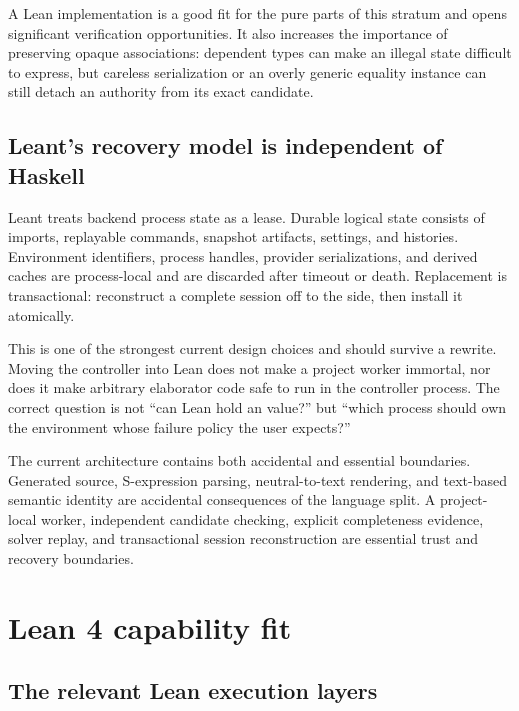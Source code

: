 \documentclass[10pt,letterpaper,oneside]{report}
\newcommand{\code}[1]{\texttt{\detokenize{#1}}}
\begin{document}
A Lean implementation is a good fit for the pure parts of this stratum and opens significant verification opportunities. It also increases the importance of preserving opaque associations: dependent types can make an illegal state difficult to express, but careless serialization or an overly generic equality instance can still detach an authority from its exact candidate.

\section{Leant's recovery model is independent of Haskell}

Leant treats backend process state as a lease. Durable logical state consists of imports, replayable commands, snapshot artifacts, settings, and histories. Environment identifiers, process handles, provider serializations, and derived caches are process-local and are discarded after timeout or death. Replacement is transactional: reconstruct a complete session off to the side, then install it atomically.

This is one of the strongest current design choices and should survive a rewrite. Moving the controller into Lean does not make a project worker immortal, nor does it make arbitrary elaborator code safe to run in the controller process. The correct question is not ``can Lean hold an \code{Environment} value?'' but ``which process should own the environment whose failure policy the user expects?''

\begin{summarybox}
The current architecture contains both accidental and essential boundaries. Generated source, S-expression parsing, neutral-to-text rendering, and text-based semantic identity are accidental consequences of the language split. A project-local worker, independent candidate checking, explicit completeness evidence, solver replay, and transactional session reconstruction are essential trust and recovery boundaries.
\end{summarybox}

\chapter{Lean 4 capability fit}\label{ch:lean-fit}

\section{The relevant Lean execution layers}
\end{document}
